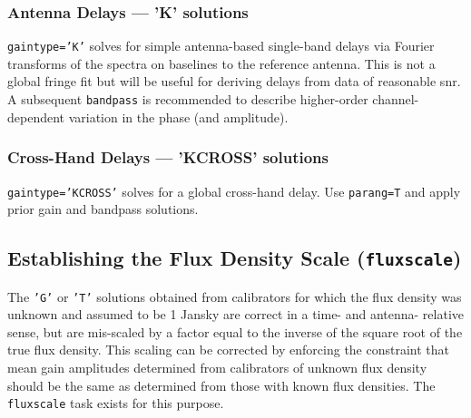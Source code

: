 {%
\subsubsection{Antenna Delays --- 'K' solutions}
\label{section:cal.solve.gain.k}
{\tt gaintype='K'} solves for simple antenna-based single-band delays
                   via Fourier transforms of the spectra on baselines to the
                   reference antenna. This is not a global fringe fit
                   but will be useful for deriving delays from data of
                   reasonable snr. A subsequent {\tt bandpass} is 
                   recommended to describe higher-order channel-dependent
		   variation in the phase (and amplitude).
\subsubsection{Cross-Hand  Delays --- 'KCROSS' solutions}
\label{section:cal.solve.gain.kcross}
{\tt gaintype='KCROSS'} solves for a global cross-hand
                   delay.  Use {\tt parang=T} and apply prior gain and
                   bandpass solutions. 



\subsection{Establishing the Flux Density Scale ({\tt fluxscale}) }
\label{section:cal.solve.fluxscale}

The {\tt 'G'} or {\tt 'T'} solutions obtained from calibrators for
which the flux 
density was unknown and assumed to be 1 Jansky are correct in a time- and
antenna- relative sense, but are mis-scaled by a factor equal to the
inverse of the square root of the true flux density.  This scaling can
be corrected by enforcing the constraint that mean gain amplitudes
determined from calibrators of unknown flux density should be the same
as determined from those with known flux densities.  The {\tt
fluxscale} task exists for this purpose.  

}
